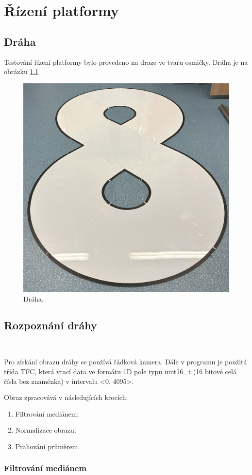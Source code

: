 \chapter{Řízení platformy}
\label{sec:PlatformControl}
\vspace{-20pt}

\section{Dráha}
Testování řízení platformy bylo provedeno na draze ve tvaru osmičky.
Dráha je na obrázku \ref{fig:Road}

\begin{figure}[!htbp]
    \centering
    \includegraphics[width = 0.5\linewidth]{Figures/Road.png}
    \caption{Dráha.}
    \label{fig:Road}
\end{figure}

\section{Rozpoznání dráhy}\

Pro získání obrazu dráhy se používá řádková kamera. Dále v programu
je použitá třída TFC\cite{draha}, která vrací data ve formátu 1D pole typu uint16\_t
(16 bitové celá čísla bez znaménka) v intervalu <0, 4095>.

Obraz zpracovává v následujících krocích:
\begin{enumerate}
	\item Filtrování mediánem;
	\item Normalizace obrazu;
	\item Prahování průměrem.
\end{enumerate}

\subsection{Filtrování mediánem}\


